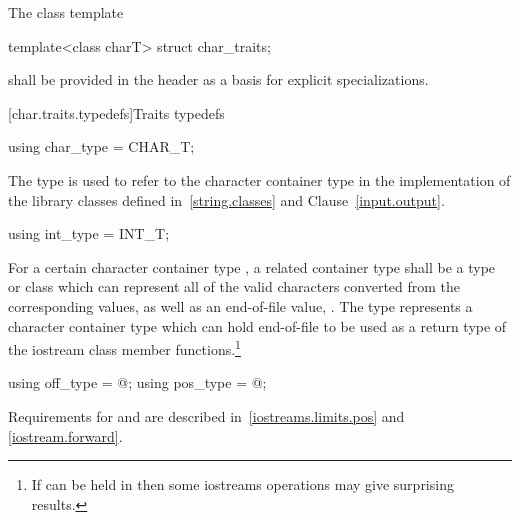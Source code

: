 \pnum
The class template

%
\begin{codeblock}
template<class charT> struct char_traits;
\end{codeblock}

shall be provided in the header
as a basis for explicit specializations.

[char.traits.typedefs]{Traits typedefs}

%
\begin{itemdecl}
using char_type = CHAR_T;
\end{itemdecl}

\begin{itemdescr}
\pnum
The type
is used to refer to the character container type
in the implementation of the library classes defined in~\ref{string.classes} and Clause~\ref{input.output}.
\end{itemdescr}

%
\begin{itemdecl}
using int_type = INT_T;
\end{itemdecl}

\begin{itemdescr}
\pnum
\requires
For a certain character container type
,
a related container type
shall be a type or class which can represent all of the
valid characters converted from the corresponding
values, as well as an end-of-file value,
.
The type
represents a character container type
which can hold end-of-file to be used as a return type
of the iostream class member functions.\footnote{If
can be held in
then some iostreams operations may give surprising results.}
\end{itemdescr}

%
%
\begin{itemdecl}
using off_type = @\impdef@;
using pos_type = @\impdef@;
\end{itemdecl}

\begin{itemdescr}
\pnum
\requires
Requirements for
and
are described in~\ref{iostreams.limits.pos} and \ref{iostream.forward}.
\end{itemdescr}

